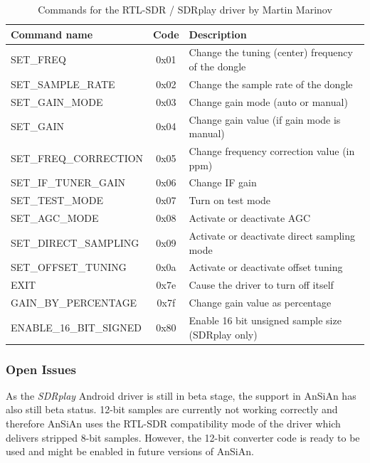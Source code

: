 \begin{table}
	\begin{center}
		\begin{tabular}{l c l}
			Command name & Code & Description \\\hline
			SET\_FREQ & 0x01 & Change the tuning (center) frequency of the dongle \\
			SET\_SAMPLE\_RATE & 0x02 & Change the sample rate of the dongle \\
			SET\_GAIN\_MODE & 0x03 & Change gain mode (auto or manual) \\
			SET\_GAIN & 0x04 & Change gain value (if gain mode is manual) \\
			SET\_FREQ\_CORRECTION & 0x05 & Change frequency correction value (in ppm) \\
			SET\_IF\_TUNER\_GAIN & 0x06 & Change \ac{IF} gain \\
			SET\_TEST\_MODE & 0x07 & Turn on test mode \\
			SET\_AGC\_MODE & 0x08 & Activate or deactivate \ac{AGC} \\
			SET\_DIRECT\_SAMPLING & 0x09 & Activate or deactivate direct sampling mode \\
			SET\_OFFSET\_TUNING & 0x0a & Activate or deactivate offset tuning \\
			EXIT & 0x7e & Cause the driver to turn off itself \\
			GAIN\_BY\_PERCENTAGE & 0x7f & Change gain value as percentage \\
			ENABLE\_16\_BIT\_SIGNED & 0x80 & Enable 16 bit unsigned sample size (SDRplay only) \\\hline
		\end{tabular}
		\caption{Commands for the RTL-SDR / SDRplay driver by Martin Marinov}
		\label{tab:sdrplay_cmds}
	\end{center}
\end{table}



\subsubsection{Open Issues}

As the \emph{SDRplay} Android driver is still in beta stage, the support in AnSiAn has
also still beta status. 12-bit samples are currently not working correctly and
therefore \ac{AnSiAn} uses the RTL-SDR compatibility mode of the driver which
delivers stripped 8-bit samples. However, the 12-bit converter code is ready to
be used and might be enabled in future versions of \ac{AnSiAn}.


